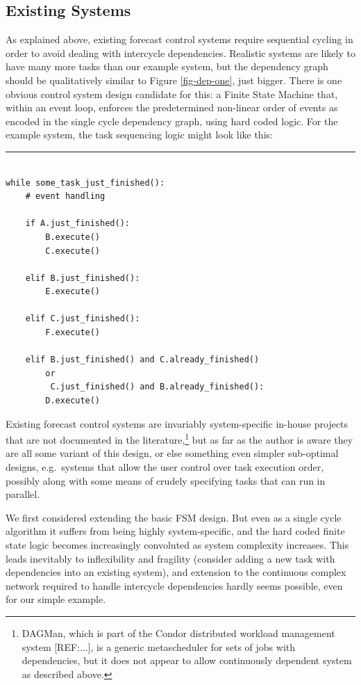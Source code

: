 \documentclass[11pt,a4paper]{article}
\begin{document}
\subsection{Existing Systems}

As explained above, existing forecast control systems require sequential
cycling in order to avoid dealing with intercycle dependencies.
Realistic systems are likely to have many more tasks than our example
system, but the dependency graph should be qualitatively similar to
Figure \ref{fig-dep-one}, just bigger.  There is one obvious control
system design candidate for this: a Finite State Machine that, within an
event loop, enforces the predetermined non-linear order of events as
encoded in the single cycle dependency graph, using hard coded logic.
For the example system, the task sequencing logic might look like this:

{\small
\noindent
\rule{5cm}{.2mm}
\begin{lstlisting} 

while some_task_just_finished():
    # event handling

    if A.just_finished():
        B.execute()
        C.execute()

    elif B.just_finished():
        E.execute()

    elif C.just_finished():
        F.execute()

    elif B.just_finished() and C.already_finished()
        or
         C.just_finished() and B.already_finished(): 
        D.execute()

\end{lstlisting}
}

Existing forecast control systems are invariably system-specific
in-house projects that are not documented in the
literature,\footnote{DAGMan, which is part of the Condor distributed
workload management system [REF:...], is a generic metascheduler for
sets of jobs with dependencies, but it does not appear to allow
continuously dependent system as described above.} but as far as the
author is aware they are all some  variant of this design, or else
something even simpler sub-optimal designs, e.g.\ systems that allow the
user control over task execution order, possibly along with some means
of crudely specifying tasks that can run in parallel. 
 
We first considered extending the basic FSM design.  But even as a
single cycle algorithm it suffers from being highly system-specific, and
the hard coded finite state logic becomes increasingly convoluted as
system complexity increases. This leads inevitably to inflexibility and
fragility (consider adding a new task with dependencies into an existing
system), and extension to the continuous complex network required to
handle intercycle dependencies hardly seems possible, even for our
simple example.
\end{document}
